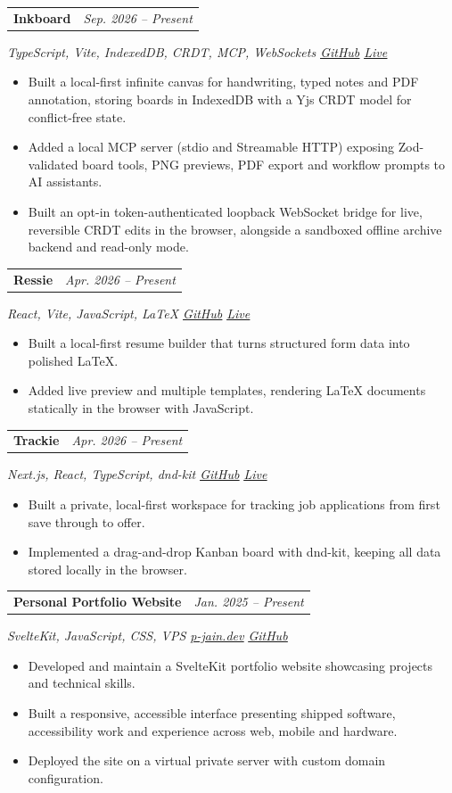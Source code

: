 \documentclass[10pt,a4paper]{article}
\makeatletter
\let\oldhref\href
\renewcommand{\href}[2]{\oldhref{#1}{\underline{#2}}}
\newcommand{\resumeProject}[3]{%
  \begin{tabularx}{\textwidth}{@{}Xr@{}}
    \textbf{#1} & \textit{#2}
  \end{tabularx}
  \textit{\color{muted}#3}
  \vspace{-1pt}
}
\makeatother
\begin{document}
\resumeProject{Inkboard}{Sep. 2026 -- Present}{TypeScript, Vite, IndexedDB, CRDT, MCP, WebSockets \textbar{} \href{https://github.com/pjrus/inkboard}{GitHub} \textbar{} \href{https://pjrus.github.io/inkboard/}{Live}}
\begin{itemize}
  \item Built a local-first infinite canvas for handwriting, typed notes and PDF annotation, storing boards in IndexedDB with a Yjs CRDT model for conflict-free state.
  \item Added a local MCP server (stdio and Streamable HTTP) exposing Zod-validated board tools, PNG previews, PDF export and workflow prompts to AI assistants.
  \item Built an opt-in token-authenticated loopback WebSocket bridge for live, reversible CRDT edits in the browser, alongside a sandboxed offline archive backend and read-only mode.
\end{itemize}

\resumeProject{Ressie}{Apr. 2026 -- Present}{React, Vite, JavaScript, LaTeX \textbar{} \href{https://github.com/pjrus/ressie}{GitHub} \textbar{} \href{https://pjrus.github.io/ressie/}{Live}}
\begin{itemize}
  \item Built a local-first resume builder that turns structured form data into polished LaTeX.
  \item Added live preview and multiple templates, rendering LaTeX documents statically in the browser with JavaScript.
\end{itemize}

\resumeProject{Trackie}{Apr. 2026 -- Present}{Next.js, React, TypeScript, dnd-kit \textbar{} \href{https://github.com/pjrus/trackie}{GitHub} \textbar{} \href{https://pjrus.github.io/trackie/kanban/}{Live}}
\begin{itemize}
  \item Built a private, local-first workspace for tracking job applications from first save through to offer.
  \item Implemented a drag-and-drop Kanban board with dnd-kit, keeping all data stored locally in the browser.
\end{itemize}

\resumeProject{Personal Portfolio Website}{Jan. 2025 -- Present}{SvelteKit, JavaScript, CSS, VPS \textbar{} \href{https://p-jain.dev}{p-jain.dev} \textbar{} \href{https://github.com/pjrus/p-jain-dev}{GitHub}}
\begin{itemize}
  \item Developed and maintain a SvelteKit portfolio website showcasing projects and technical skills.
  \item Built a responsive, accessible interface presenting shipped software, accessibility work and experience across web, mobile and hardware.
  \item Deployed the site on a virtual private server with custom domain configuration.
\end{itemize}
\end{document}
